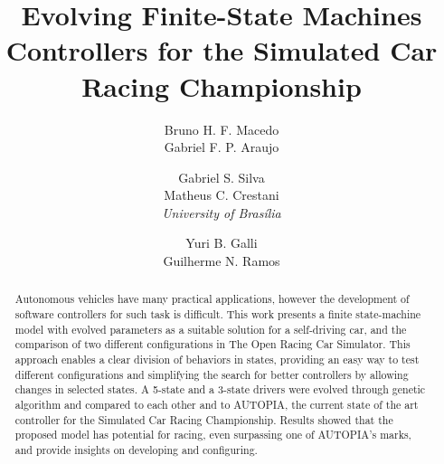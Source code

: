 \documentclass[a4paper]{sbgames}
\title{Evolving Finite-State Machines Controllers for the Simulated Car Racing Championship}
\author{Bruno H. F. Macedo\\Gabriel F. P. Araujo\\
		\and Gabriel S. Silva\\Matheus C. Crestani\\\textit{University of Bras\'{i}lia}
		\and Yuri B. Galli\\ Guilherme N. Ramos\\
}
\begin{document}
	\maketitle

	\begin{abstract}
		Autonomous vehicles have many practical applications, however the development of software controllers for such task is difficult. This work presents a finite state-machine model with evolved parameters as a suitable solution for a self-driving car, and the comparison of two different configurations in The Open Racing Car Simulator. This approach enables a clear division of behaviors in states, providing an easy way to test different configurations and simplifying the search for better controllers by allowing changes in selected states. A 5-state and a 3-state drivers were evolved through genetic algorithm and compared to each other and to AUTOPIA, the current state of the art controller for the Simulated Car Racing Championship. Results showed that the proposed model has potential for racing, even surpassing one of AUTOPIA's marks, and provide insights on developing and configuring.
	\end{abstract}

	\keywordlist
	\contactlist

	
	


	
	
\end{document}
